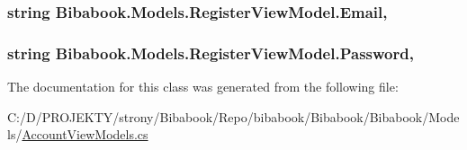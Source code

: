\subsubsection[{Email}]{\setlength{\rightskip}{0pt plus 5cm}string Bibabook.\+Models.\+Register\+View\+Model.\+Email\hspace{0.3cm}{\ttfamily [get]}, {\ttfamily [set]}}\label{class_bibabook_1_1_models_1_1_register_view_model_a8f0dd5aedc3ea8eac91f58acb04c85a8}
\hypertarget{class_bibabook_1_1_models_1_1_register_view_model_a43dcf95b106a6bf8476732ef38f23efb}{}
\subsubsection[{Password}]{\setlength{\rightskip}{0pt plus 5cm}string Bibabook.\+Models.\+Register\+View\+Model.\+Password\hspace{0.3cm}{\ttfamily [get]}, {\ttfamily [set]}}\label{class_bibabook_1_1_models_1_1_register_view_model_a43dcf95b106a6bf8476732ef38f23efb}


The documentation for this class was generated from the following file\+:\begin{DoxyCompactItemize}
\item 
C\+:/\+D/\+P\+R\+O\+J\+E\+K\+T\+Y/strony/\+Bibabook/\+Repo/bibabook/\+Bibabook/\+Bibabook/\+Models/\hyperlink{_account_view_models_8cs}{Account\+View\+Models.\+cs}\end{DoxyCompactItemize}
